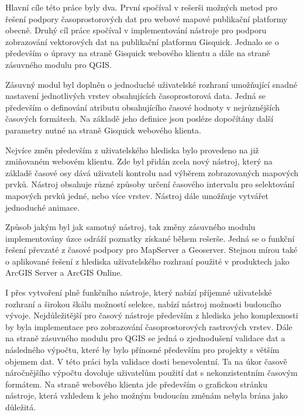 \newpage
{}
Hlavní cíle této práce byly dva. První spočíval v rešerši možných metod pro řešení podpory časoprostorových dat pro webové mapové publikační platformy obecně. Druhý cíl práce spočíval v implementování nástroje pro podporu zobrazování vektorových dat na publikační platformu Gisquick. Jednalo se o především o úpravy na straně Gisquick webového klientu a dále na straně zásuvného modulu pro QGIS.

Zásuvný modul byl doplněn o jednoduché uživatelské rozhraní umožňující snadné nastavení jednotlivých vrstev obsahujících časoprostorová data. Jedná se především o definování atributu obsahujícího časové hodnoty v nejrůznějších časových formátech. Na základě jeho definice jsou posléze dopočítány další parametry nutné na straně Gisquick webového klienta.

Nejvíce změn především z uživatelského hlediska bylo provedeno na již zmiňovaném webovém klientu. Zde byl přidán zcela nový nástroj, který na základě časové osy dává uživateli kontrolu nad výběrem zobrazovaných mapových prvků. Nástroj obsahuje různé způsoby určení časového intervalu pro selektování mapových prvků jedné, nebo více vrstev. Nástroj dále umožňuje vytvářet jednoduché animace. 

Způsob jakým byl jak samotný nástroj, tak změny zásuvného modulu implementovány úzce odráží poznatky získané během rešerše. Jedná se o funkční řešení převzaté z časové podpory pro MapServer a Geoserver. Stejnou mírou také o aplikované řešení z hlediska uživatelského rozhraní použité v produktech jako ArcGIS Server a ArcGIS Online.

I přes vytvoření plně funkčního nástroje, který nabízí příjemné uživatelské rozhraní a širokou škálu možností selekce, nabízí nástroj možnosti budoucího vývoje. Nejdůležitější pro časový nástroje především z hlediska jeho komplexnosti by byla implementace pro zobrazování časoprostorových rastrových vrstev. Dále na straně zásuvného modulu pro QGIS se jedná o zjednodušení validace dat a následného výpočtu, které by bylo přínosné především pro projekty s větším objemem dat. V této práci byla validace dosti benevolentní. Ta na úkor časově náročnějšího výpočtu dovoluje uživatelům použití dat s nekonzistentním časovým formátem. Na straně webového klienta jde především o grafickou stránku nástroje, která vzhledem k jeho možným budoucím změnám nebyla brána jako důležitá.
